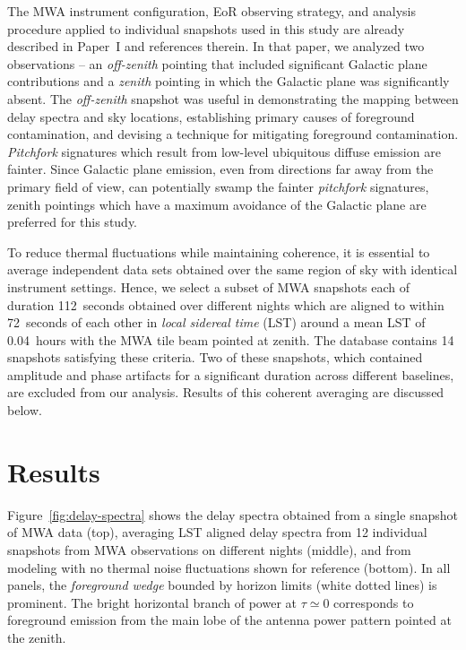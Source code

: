 \documentclass[preprint2,apjl,numberedappendix,twocolappendix,appendixfloats]{emulateapj}
\begin{document}
The MWA instrument configuration, EoR observing strategy, and analysis procedure applied to individual snapshots used in this study are already described in Paper~I and references therein. In that paper, we analyzed two observations -- an {\it off-zenith} pointing that included significant Galactic plane contributions and a {\it zenith} pointing in which the Galactic plane was significantly absent. The {\it off-zenith} snapshot was useful in demonstrating the mapping between delay spectra and sky locations, establishing primary causes of foreground contamination, and devising a technique for mitigating foreground contamination. {\it Pitchfork} signatures which result from low-level ubiquitous diffuse emission are fainter. Since Galactic plane emission, even from directions far away from the primary field of view, can potentially swamp the fainter {\it pitchfork} signatures, zenith pointings which have a maximum avoidance of the Galactic plane are preferred for this study.

To reduce thermal fluctuations while maintaining coherence, it is essential to average independent data sets obtained over the same region of sky with identical instrument settings. Hence, we select a subset of MWA snapshots each of duration 112~seconds obtained over different nights which are aligned to within 72~seconds of each other in {\it local sidereal time} (LST) around a mean LST of 0.04~hours with the MWA tile beam pointed at zenith. The database contains 14 snapshots satisfying these criteria. Two of these snapshots, which contained amplitude and phase artifacts for a significant duration across different baselines, are excluded from our analysis. Results of this coherent averaging are discussed below.

\section{Results}\label{sec:results}

Figure~\ref{fig:delay-spectra} shows the delay spectra obtained from a single snapshot of MWA data (top), averaging LST aligned delay spectra from 12 individual snapshots from MWA observations on different nights (middle), and from modeling with no thermal noise fluctuations shown for reference (bottom). In all panels, the {\it foreground wedge} bounded by horizon limits (white dotted lines) is prominent. The bright horizontal branch of power at $\tau\simeq 0$ corresponds to foreground emission from the main lobe of the antenna power pattern pointed at the zenith. 
\end{document}
